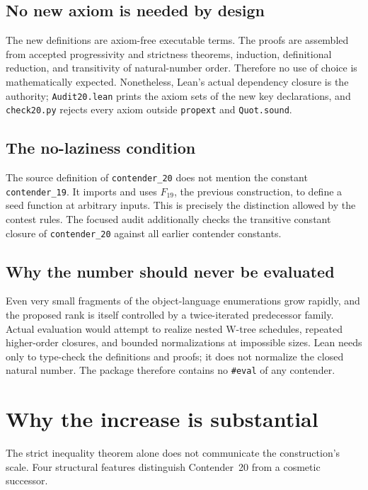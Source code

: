 \documentclass[11pt]{article}
\theoremstyle{definition}
\theoremstyle{remark}
\newcommand{\leanname}[1]{\nolinkurl{#1}}
\newcommand{\code}[1]{\texttt{#1}}
\begin{document}
\subsection{No new axiom is needed by design}

The new definitions are axiom-free executable terms.  The proofs are assembled
from accepted progressivity and strictness theorems, induction, definitional
reduction, and transitivity of natural-number order.  Therefore no use of
choice is mathematically expected.  Nonetheless, Lean's actual dependency
closure is the authority; \leanname{Audit20.lean} prints the axiom sets of the
new key declarations, and \leanname{check20.py} rejects every axiom outside
\leanname{propext} and \leanname{Quot.sound}.

\subsection{The no-laziness condition}

The source definition of \leanname{contender_20} does not mention the constant
\leanname{contender_19}.  It imports and uses $F_{19}$, the previous
construction, to define a seed function at arbitrary inputs.  This is precisely
the distinction allowed by the contest rules.  The focused audit additionally
checks the transitive constant closure of \leanname{contender_20} against all
earlier contender constants.

\subsection{Why the number should never be evaluated}

Even very small fragments of the object-language enumerations grow rapidly, and
the proposed rank is itself controlled by a twice-iterated predecessor family.
Actual evaluation would attempt to realize nested W-tree schedules, repeated
higher-order closures, and bounded normalizations at impossible sizes.  Lean
needs only to type-check the definitions and proofs; it does not normalize the
closed natural number.  The package therefore contains no \code{\#eval} of
any contender.

\section{Why the increase is substantial}

The strict inequality theorem alone does not communicate the construction's
scale.  Four structural features distinguish Contender~20 from a cosmetic
successor.
\end{document}
